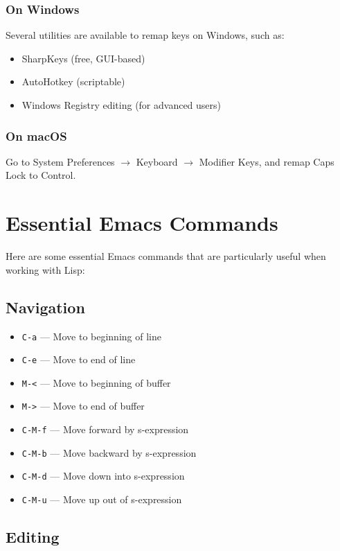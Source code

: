\subsubsection{On Windows}

Several utilities are available to remap keys on Windows, such as:

\begin{itemize}
\item SharpKeys (free, GUI-based)
\item AutoHotkey (scriptable)
\item Windows Registry editing (for advanced users)
\end{itemize}

\subsubsection{On macOS}

Go to System Preferences $\rightarrow$ Keyboard $\rightarrow$ Modifier Keys, and remap Caps Lock to
Control.

\section{Essential Emacs Commands}

Here are some essential Emacs commands that are particularly useful when working with
Lisp:

\subsection{Navigation}

\begin{itemize}
\item \texttt{C-a} --- Move to beginning of line
\item \texttt{C-e} --- Move to end of line
\item \texttt{M-<} --- Move to beginning of buffer
\item \texttt{M->} --- Move to end of buffer
\item \texttt{C-M-f} --- Move forward by s-expression
\item \texttt{C-M-b} --- Move backward by s-expression
\item \texttt{C-M-d} --- Move down into s-expression
\item \texttt{C-M-u} --- Move up out of s-expression
\end{itemize}

\subsection{Editing}

